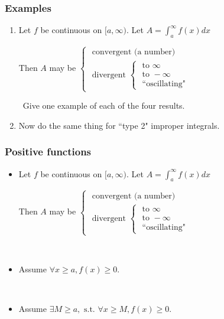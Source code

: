 \documentclass[14pt]{beamer}
\newcommand{\p}{\pause}
\newcommand{\setsize}[1]{\fontsize{#1}{#1}\selectfont} %
\newcommand{\smallerfont}{\setsize{13}} %
\begin{document}
	\begin{frame}[t]
		\frametitle{Examples}

		\begin{enumerate}
			\item Let $f$ be continuous on $[a, \infty)$. Let
				${\displaystyle  A = \int_a^{\infty} f(x) dx }$

				Then $A$ may be ${\displaystyle  \begin{cases}\mbox{ convergent (a number) } \\ \mbox{ divergent } \begin{cases}\mbox{ to } \infty \\ \mbox{ to } - \infty \\ \mbox{ ``oscillating"}\end{cases}\end{cases} }$

				\
 Give one example of each of the four results.
				\vfill
				\p

			\item Now do the same thing for ``type 2" improper integrals.
		\end{enumerate}
		\vfill
	\end{frame}
	\begin{frame}[t]
		\smallerfont
		\frametitle{Positive functions}

		\begin{itemize}
			\item Let $f$ be continuous on $[a, \infty)$. Let
				${\displaystyle  A = \int_a^{\infty} f(x) dx }$

				Then $A$ may be ${\displaystyle  \begin{cases}\mbox{ convergent (a number) } \\ \mbox{ divergent } \begin{cases}\mbox{ to } \infty \\ \mbox{ to } - \infty \\ \mbox{ ``oscillating"}\end{cases}\end{cases} }$

				\ \p

			\item Assume ${\displaystyle \forall x \geq a, f(x) \geq 0}$.
				\vspace{.2cm}


				\ \p

			\item Assume ${\displaystyle \exists M \geq a, \mbox{ s.t. } \forall x \geq M, f(x) \geq 0}$.
				\vspace{.2cm}

		\end{itemize}
	\end{frame}
\end{document}
